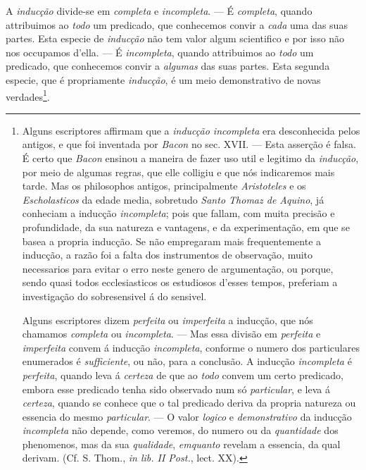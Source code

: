 A \emph{inducção} divide-se em \emph{completa} e \emph{incompleta}. --- É \emph{completa}, quando attribuimos ao \emph{todo} um predicado, que conhecemos convir a \emph{cada} uma das suas partes. Esta especie de \emph{inducção} não tem valor algum scientifico e por isso não nos occupamos d'ella. --- É \emph{incompleta}, quando attribuimos ao \emph{todo} um predicado, que conhecemos convir a \emph{algumas} das suas partes. Esta segunda especie, que é propriamente \emph{inducção}, é um meio demonstrativo de novas verdades\footnote{Alguns escriptores affirmam que a \emph{inducção incompleta} era desconhecida pelos antigos, e que foi inventada por \emph{Bacon} no sec. XVII. --- Esta asserção é falsa. É certo que \emph{Bacon} ensinou a maneira de fazer uso util e legitimo da \emph{inducção}, por meio de algumas regras, que elle colligiu e que nós indicaremos mais tarde. Mas os philosophos antigos, principalmente \emph{Aristoteles} e os \emph{Escholasticos} da edade media, sobretudo \emph{Santo Thomaz de Aquino}, já conheciam a inducção \emph{incompleta}; pois que fallam, com muita precisão e profundidade, da sua natureza e vantagens, e da experimentação, em que se basea a propria inducção. Se não empregaram mais frequentemente a inducção, a razão foi a falta dos instrumentos de observação, muito necessarios para evitar o erro neste genero de argumentação, ou porque, sendo quasi todos ecclesiasticos os estudiosos d'esses tempos, preferiam a investigação do sobresensivel á do sensivel.\par Alguns escriptores dizem \emph{perfeita} ou \emph{imperfeita} a inducção, que nós chamamos \emph{completa} ou \emph{incompleta}. --- Mas essa divisão em \emph{perfeita} e \emph{imperfeita} convem á inducção \emph{incompleta}, conforme o numero dos particulares enumerados é \emph{sufficiente}, ou não, para a conclusão. A inducção \emph{incompleta} é \emph{perfeita}, quando leva á \emph{certeza} de que ao \emph{todo} convem um certo predicado, embora esse predicado tenha sido observado num só \emph{particular}, e leva á \emph{certeza}, quando se conhece que o tal predicado deriva da propria natureza ou essencia do mesmo \emph{particular}. --- O valor \emph{logico} e \emph{demonstrativo} da inducção \emph{incompleta} não depende, como veremos, do numero ou da \emph{quantidade} dos phenomenos, mas da sua \emph{qualidade}, \emph{emquanto} revelam a essencia, da qual derivam. (Cf. S. Thom., \emph{in lib. II Post.}, lect. XX).}.

